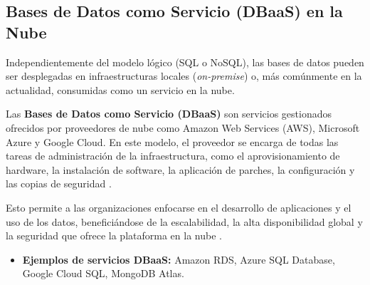 \subsection{Bases de Datos como Servicio (DBaaS) en la Nube}
\label{subsec:dbaas}

Independientemente del modelo lógico (SQL o NoSQL), las bases de datos pueden ser desplegadas en infraestructuras locales (\textit{on-premise}) o, más comúnmente en la actualidad, consumidas como un servicio en la nube.

Las \textbf{Bases de Datos como Servicio (DBaaS)} son servicios gestionados ofrecidos por proveedores de nube como Amazon Web Services (AWS), Microsoft Azure y Google Cloud. En este modelo, el proveedor se encarga de todas las tareas de administración de la infraestructura, como el aprovisionamiento de hardware, la instalación de software, la aplicación de parches, la configuración y las copias de seguridad \cite{azure2024dbaas}.

Esto permite a las organizaciones enfocarse en el desarrollo de aplicaciones y el uso de los datos, beneficiándose de la escalabilidad, la alta disponibilidad global y la seguridad que ofrece la plataforma en la nube \cite{amazon2024rds}.
\begin{itemize}
    \item \textbf{Ejemplos de servicios DBaaS:} Amazon RDS, Azure SQL Database, Google Cloud SQL, MongoDB Atlas.
\end{itemize}